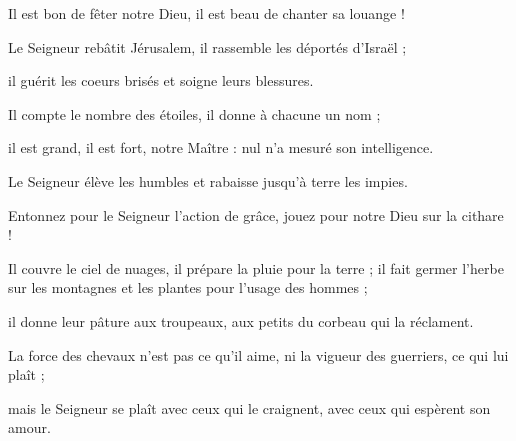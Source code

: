 \item Il est bon de fêter notre Dieu, il est beau de chanter sa louange !

\item Le Seigneur rebâtit Jérusalem, il rassemble les déportés d'Israël ;

\item il guérit les coeurs brisés et soigne leurs blessures.

\item Il compte le nombre des étoiles, il donne à chacune un nom ;

\item il est grand, il est fort, notre Maître : nul n'a mesuré son intelligence.

\item Le Seigneur élève les humbles et rabaisse jusqu'à terre les impies.

\item Entonnez pour le Seigneur l'action de grâce, jouez pour notre Dieu sur la cithare !

\item Il couvre le ciel de nuages, il prépare la pluie pour la terre ; il fait germer l'herbe sur les montagnes et les plantes pour l'usage des hommes ;

\item il donne leur pâture aux troupeaux, aux petits du corbeau qui la réclament.

\item La force des chevaux n'est pas ce qu'il aime, ni la vigueur des guerriers, ce qui lui plaît ;

\item mais le Seigneur se plaît avec ceux qui le craignent, avec ceux qui espèrent son amour.